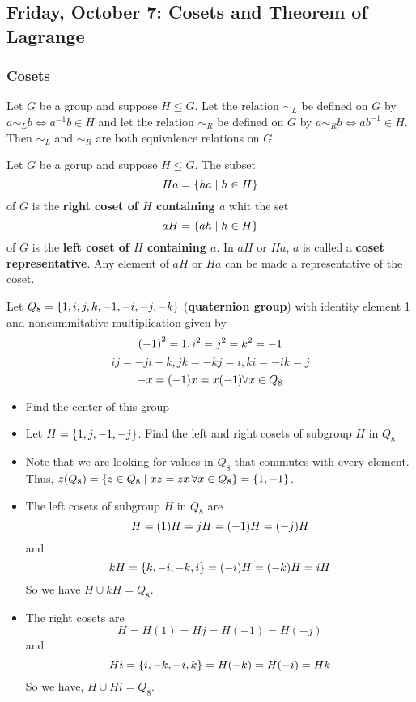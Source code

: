 \subsection{Friday, October 7: Cosets and Theorem of Lagrange}

\subsubsection{Cosets}

\begin{theorem}
    Let $G$ be a group and suppose $H \leq G$. Let the relation $\sim_L$ be defined on $G$ by $a \sim_L b \Leftrightarrow a^{-1}b \in H$ and let the relation $\sim_R$ be defined on $G$ by $a \sim_R b \Leftrightarrow ab^{-1} \in H$. Then $\sim_L$ and $\sim_R$ are both equivalence relations on $G$.
\end{theorem}

\begin{definition}
    Let $G$ be a gorup and suppose $H \leq G$. The subset
    \[ Ha = \qty{ha \mid h \in H} \]
    of $G$ is the \textbf{right coset of $H$ containing $a$} whit the set
    \[ aH = \qty{ah \mid h \in H} \]
    of $G$ is the \textbf{left coset of $H$ containing $a$}. In $aH$ or $Ha$, $a$ is called a \textbf{coset representative}. Any element of $aH$ or $Ha$ can be made a representative of the coset.
\end{definition}

\begin{exercise}
    Let $Q_8 = \qty{1, i, j, k, -1, -i, -j, -k}$ (\textbf{quaternion group}) with identity element 1 and noncummitative multiplication given by
    \[ \qty(-1)^2 = 1, i^2 = j^2 = k^2 = -1 \]
    \[ ij = -ji - k, jk= -kj = i, ki = -ik = j \]
    \[ -x = \qty(-1)x = x\qty(-1) \forall x \in Q_8 \]
    \begin{itemize}
        \item Find the center of this group
        \item Let $H = \qty{1, j, -1, -j}$. Find the left and right cosets of subgroup $H$ in $Q_8$
    \end{itemize}
\end{exercise}

\begin{solution}
    \begin{itemize}
        \item Note that we are looking for values in $Q_8$ that commutes with every element. Thus, $z\qty(Q_8) = \qty{z \in Q_8 \mid xz = zx \, \forall x \in Q_8} = \qty{1, -1}$.
        \item The left cosets of subgroup $H$ in $Q_8$ are
        \[ H = \qty(1)H = jH = \qty(-1)H = \qty(-j)H \]
        and
        \[ kH = \qty{k, -i, -k, i} = \qty(-i)H = \qty(-k)H = iH  \]
        So we have $H \cup kH = Q_8$.  
        \item The right cosets are 
        \[ H = H(1) = Hj = H(-1) = H(-j) \]
        and
        \[ Hi = \qty{i, -k, -i, k} = H \qty(-k) = H \qty(-i) = Hk \]
        So we have, $H \cup Hi = Q_8$.
    \end{itemize}
\end{solution}

